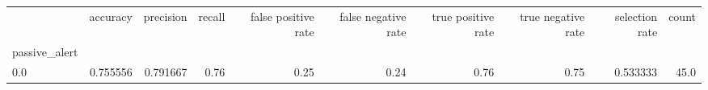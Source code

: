 \begin{tabular}{lrrrrrrrrr}
\toprule
{} &  accuracy &  precision &  recall &  false positive rate &  false negative rate &  true positive rate &  true negative rate &  selection rate &  count \\
passive\_alert &           &            &         &                      &                      &                     &                     &                 &        \\
\midrule
0.0           &  0.755556 &   0.791667 &    0.76 &                 0.25 &                 0.24 &                0.76 &                0.75 &        0.533333 &   45.0 \\
\bottomrule
\end{tabular}
